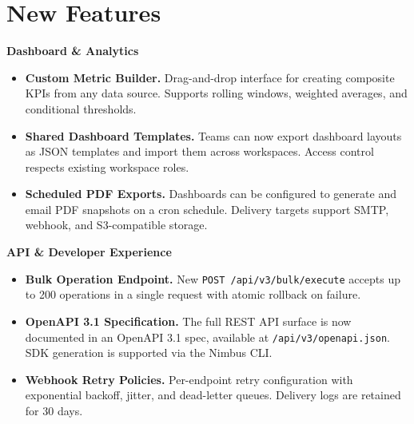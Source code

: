 \section{\faStar\hspace{6pt}New Features}

\begin{featurebox}
  {\small\bfseries\color{accTeal}Dashboard \& Analytics\par}
  \vspace{4pt}

  \begin{itemize}[leftmargin=*,nosep,itemsep=0pt,topsep=4pt]
    \item \textbf{Custom Metric Builder.} Drag-and-drop interface for creating
      composite KPIs from any data source. Supports rolling windows,
      weighted averages, and conditional thresholds.
    \item \textbf{Shared Dashboard Templates.} Teams can now export dashboard
      layouts as JSON templates and import them across workspaces. Access
      control respects existing workspace roles.
    \item \textbf{Scheduled PDF Exports.} Dashboards can be configured to
      generate and email PDF snapshots on a cron schedule. Delivery targets
      support SMTP, webhook, and S3-compatible storage.
  \end{itemize}
\end{featurebox}

\begin{featurebox}
  {\small\bfseries\color{accTeal}API \& Developer Experience\par}
  \vspace{4pt}

  \begin{itemize}[leftmargin=*,nosep,itemsep=0pt,topsep=4pt]
    \item \textbf{Bulk Operation Endpoint.} New
      \texttt{POST /api/v3/bulk/execute} accepts up to 200 operations in a
      single request with atomic rollback on failure.
    \item \textbf{OpenAPI 3.1 Specification.} The full REST API surface is now
      documented in an OpenAPI 3.1 spec, available at
      \texttt{/api/v3/openapi.json}. SDK generation is supported via the
      Nimbus CLI.
    \item \textbf{Webhook Retry Policies.} Per-endpoint retry configuration
      with exponential backoff, jitter, and dead-letter queues. Delivery logs
      are retained for 30 days.
  \end{itemize}
\end{featurebox}

